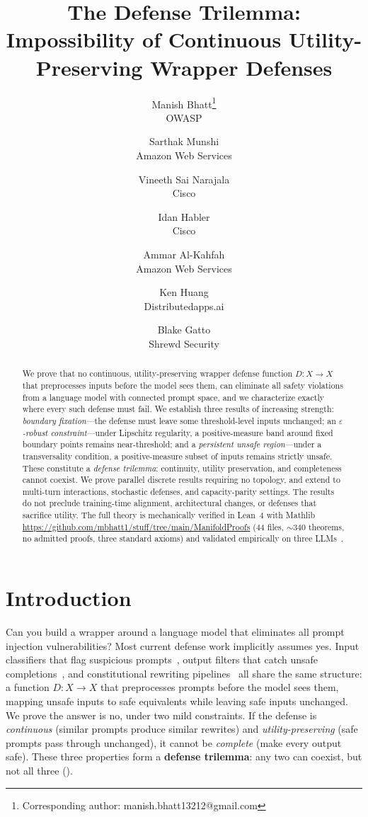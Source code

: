 \documentclass[11pt]{article}
\title{The Defense Trilemma:\\
  Impossibility of Continuous Utility-Preserving Wrapper Defenses}
\author{
    {\rm Manish Bhatt\thanks{Corresponding author: manish.bhatt13212@gmail.com}}\textsuperscript{\space}\footnotemark[2]\\
    OWASP
    \and
    {\rm Sarthak Munshi}\footnotemark[2]\\
    Amazon Web Services
  \and
  {\rm Vineeth Sai Narajala}\footnotemark[2]\\
  Cisco
  \and
  {\rm Idan Habler}\footnotemark[2]\\
  Cisco
  \and
  {\rm Ammar Al-Kahfah}\footnotemark[2]\\
  Amazon Web Services
  \and
  {\rm Ken Huang}\\
  Distributedapps.ai
  \and
  {\rm Blake Gatto}\\
  Shrewd Security
  }
\date{}
\begin{document}
\maketitle
\renewcommand{\thefootnote}{\fnsymbol{footnote}}
\begin{abstract}
We prove that no continuous, utility-preserving wrapper defense 
function $D\colon X\to X$ that preprocesses inputs before the model
sees them, can eliminate all safety violations from a language model
with connected prompt space, and we characterize exactly where every
such defense must fail. We establish three results of increasing
strength: \emph{boundary fixation}---the defense must leave some
threshold-level inputs unchanged; an \emph{$\varepsilon$-robust
constraint}---under Lipschitz regularity, a positive-measure band
around fixed boundary points remains near-threshold; and a
\emph{persistent unsafe region}---under a transversality condition, a
positive-measure subset of inputs remains strictly unsafe. These
constitute a \emph{defense trilemma}: continuity, utility preservation,
and completeness cannot coexist. We prove parallel discrete results
requiring no topology, and extend to multi-turn interactions,
stochastic defenses, and capacity-parity settings. The results do not
preclude training-time alignment, architectural changes, or defenses
that sacrifice utility. The full theory is mechanically verified in
Lean~4 with Mathlib
\url{https://github.com/mbhatt1/stuff/tree/main/ManifoldProofs}
(44 files, ${\sim}340$ theorems, no admitted proofs, three standard
axioms) and validated empirically on three LLMs~\cite{munshi2026manifold}.
\end{abstract}


\section{Introduction}
\label{sec:intro}

Can you build a wrapper around a language model that eliminates all
prompt injection vulnerabilities? Most current defense work implicitly
assumes yes. Input classifiers that flag suspicious
prompts~\cite{alon2023detecting}, output filters that catch unsafe
completions~\cite{inan2023llama}, and constitutional rewriting
pipelines~\cite{bai2022constitutional} all share the same structure: a
function $D\colon X \to X$ that preprocesses prompts before the model
sees them, mapping unsafe inputs to safe equivalents while leaving safe
inputs unchanged. We prove the answer is no, under two mild constraints. If the defense
is \emph{continuous} (similar prompts produce similar rewrites) and
\emph{utility-preserving} (safe prompts pass through unchanged), it
cannot be \emph{complete} (make every output safe). These three
properties form a \textbf{defense trilemma}: any two can coexist, but
not all three ().
\end{document}
